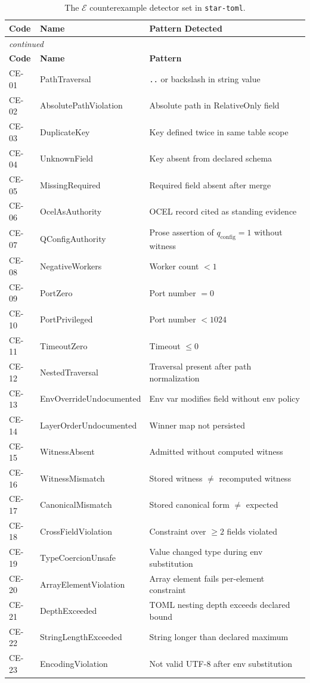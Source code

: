 \documentclass[12pt, letterpaper]{report}
\theoremstyle{plain}
\theoremstyle{definition}
\theoremstyle{remark}
\newcommand{\EE}{\mathcal{E}}
\newcommand{\qc}{q_{\mathrm{config}}}
\begin{document}
\begin{longtable}{@{}lll@{}}
\caption{The $\EE$ counterexample detector set in \texttt{star-toml}.}
\label{tab:detectors} \\
\toprule
\textbf{Code} & \textbf{Name} & \textbf{Pattern Detected} \\
\midrule
\endfirsthead
\multicolumn{3}{l}{\small\textit{continued}} \\
\toprule \textbf{Code} & \textbf{Name} & \textbf{Pattern} \\ \midrule
\endhead
CE-01 & PathTraversal & \texttt{..} or backslash in string value \\
CE-02 & AbsolutePathViolation & Absolute path in RelativeOnly field \\
CE-03 & DuplicateKey & Key defined twice in same table scope \\
CE-04 & UnknownField & Key absent from declared schema \\
CE-05 & MissingRequired & Required field absent after merge \\
CE-06 & OcelAsAuthority & OCEL record cited as standing evidence \\
CE-07 & QConfigAuthority & Prose assertion of $\qc=1$ without witness \\
CE-08 & NegativeWorkers & Worker count $< 1$ \\
CE-09 & PortZero & Port number $= 0$ \\
CE-10 & PortPrivileged & Port number $< 1024$ \\
CE-11 & TimeoutZero & Timeout $\leq 0$ \\
CE-12 & NestedTraversal & Traversal present after path normalization \\
CE-13 & EnvOverrideUndocumented & Env var modifies field without env policy \\
CE-14 & LayerOrderUndocumented & Winner map not persisted \\
CE-15 & WitnessAbsent & Admitted without computed witness \\
CE-16 & WitnessMismatch & Stored witness $\neq$ recomputed witness \\
CE-17 & CanonicalMismatch & Stored canonical form $\neq$ expected \\
CE-18 & CrossFieldViolation & Constraint over $\geq 2$ fields violated \\
CE-19 & TypeCoercionUnsafe & Value changed type during env substitution \\
CE-20 & ArrayElementViolation & Array element fails per-element constraint \\
CE-21 & DepthExceeded & TOML nesting depth exceeds declared bound \\
CE-22 & StringLengthExceeded & String longer than declared maximum \\
CE-23 & EncodingViolation & Not valid UTF-8 after env substitution \\
\bottomrule
\end{longtable}
\end{document}
